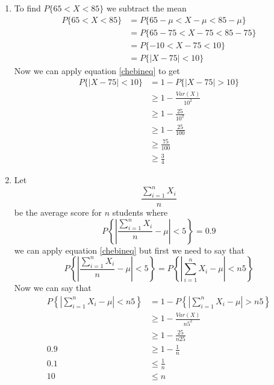 \documentclass[11pt]{article}
\begin{document}
\begin{enumerate}
\begin{enumerate}
\item
To find $P\{65<X<85\}$ we subtract the mean
\begin{align*}
P\{65<X<85\} &= P\{65-\mu<X-\mu<85-\mu\} \\ 
&= P\{65-75<X-75<85-75\} \\ 
&= P\{-10<X-75<10\} \\ 
&= P\{|X-75|<10\} 
\end{align*}
Now we can apply equation \ref{chebineq} to get
\begin{align*}
P\{|X-75|<10\} &= 1 - P\{|X-75|>10\}\\
& \ge1-\frac{Var(X)}{10^2}\\
& \ge1-\frac{25}{10^2}\\
& \ge1-\frac{25}{100}\\
& \ge\frac{75}{100}\\
& \ge\frac{3}{4}
\end{align*}

\item
Let 
$$\frac{\sum_{i=1}^nX_i}{n}$$
be the average score for $n$ students where 
$$P\left\{\left|\frac{\sum_{i=1}^nX_i}{n}-\mu\right|<5\right\} = 0.9$$
we can apply equation \ref{chebineq} but first we need to say that
$$P\left\{\left|\frac{\sum_{i=1}^nX_i}{n}-\mu\right|<5\right\} = P\left\{\left|\sum_{i=1}^nX_i-\mu\right|<n5\right\}$$
Now we can say that
\begin{align*}
P\left\{\left|\sum_{i=1}^nX_i-\mu\right|<n5\right\} &= 1- P\left\{\left|\sum_{i=1}^nX_i-\mu\right|>n5\right\}\\
&\ge 1- \frac{Var(X)}{n5^2}\\
&\ge 1- \frac{25}{n25}\\
0.9 &\ge 1- \frac{1}{n}\\
0.1 &\le \frac{1}{n}\\
10 &\le {n}\\
\end{align*}
\end{enumerate}


\end{enumerate}
\end{document}
